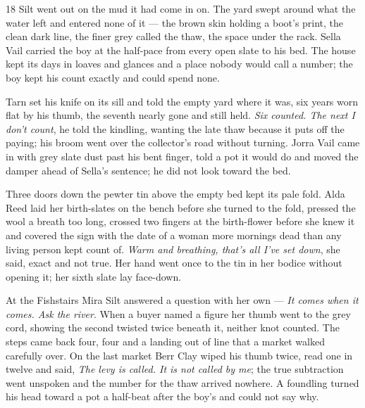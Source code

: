 





\CRtailpiece
\begin{CRchronicle}{18}
Silt went out on the mud it had come in on. The yard swept around what the water left and entered none of it --- the brown skin holding a boot’s print, the clean dark line, the finer grey called the thaw, the space under the rack. Sella Vail carried the boy at the half-pace from every open slate to his bed. The house kept its days in loaves and glances and a place nobody would call a number; the boy kept his count exactly and could spend none.

Tarn set his knife on its sill and told the empty yard where it was, six years worn flat by his thumb, the seventh nearly gone and still held. \emph{Six counted. The next I don’t count}, he told the kindling, wanting the late thaw because it puts off the paying; his broom went over the collector’s road without turning. Jorra Vail came in with grey slate dust past his bent finger, told a pot it would do and moved the damper ahead of Sella’s sentence; he did not look toward the bed.

Three doors down the pewter tin above the empty bed kept its pale fold. Alda Reed laid her birth-slates on the bench before she turned to the fold, pressed the wool a breath too long, crossed two fingers at the birth-flower before she knew it and covered the sign with the date of a woman more mornings dead than any living person kept count of. \emph{Warm and breathing, that’s all I’ve set down}, she said, exact and not true. Her hand went once to the tin in her bodice without opening it; her sixth slate lay face-down.

At the Fishstairs Mira Silt answered a question with her own --- \emph{It comes when it comes. Ask the river}. When a buyer named a figure her thumb went to the grey cord, showing the second twisted twice beneath it, neither knot counted. The steps came back four, four and a landing out of line that a market walked carefully over. On the last market Berr Clay wiped his thumb twice, read one in twelve and said, \emph{The levy is called. It is not called by me}; the true subtraction went unspoken and the number for the thaw arrived nowhere. A foundling turned his head toward a pot a half-beat after the boy’s and could not say why.


\end{CRchronicle}
